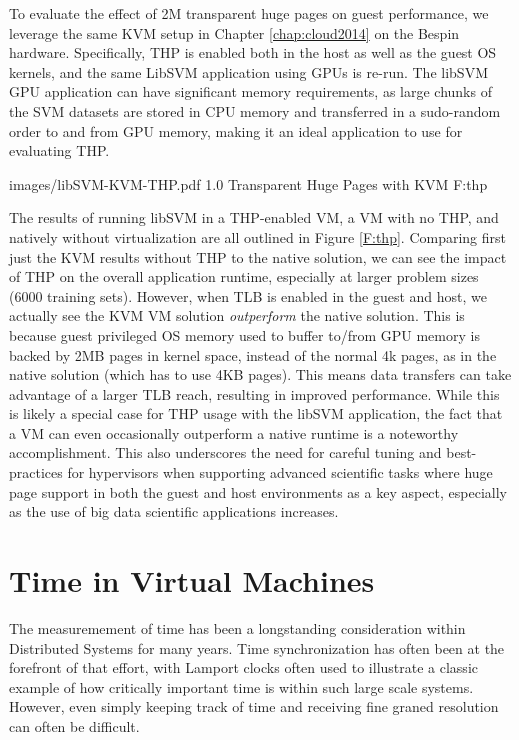 To evaluate the effect of 2M transparent huge pages on guest performance, we leverage the same KVM setup in Chapter \ref{chap:cloud2014} on the Bespin hardware. Specifically, THP is enabled both in the host as well as the guest OS kernels, and the same LibSVM application using GPUs is re-run. The libSVM GPU application can have significant memory requirements, as large chunks of the SVM datasets are stored in CPU memory and transferred in a sudo-random order to and from GPU memory, making it an ideal application to use for evaluating THP.



  {images/libSVM-KVM-THP.pdf}
  {1.0}
  {Transparent Huge Pages with KVM}
  {F:thp}


The results of running libSVM in a THP-enabled VM, a VM with no THP, and natively without virtualization are all outlined in Figure \ref{F:thp}.  Comparing first just the KVM results without THP to the native solution, we can see the impact of THP on the overall application runtime, especially at larger problem sizes (6000 training sets). However, when TLB is enabled in the guest and host, we actually see the KVM VM solution \emph{outperform} the native solution. This is because guest privileged OS memory used to buffer to/from GPU memory is backed by 2MB pages in kernel space, instead of the normal 4k pages, as in the native solution (which has to use 4KB pages). This means data transfers can take advantage of a larger TLB reach, resulting in improved performance.  While this is likely a special case for THP usage with the libSVM application, the fact that a VM can even occasionally outperform a native runtime is a noteworthy accomplishment. This also underscores the need for careful tuning and best-practices for hypervisors when supporting advanced scientific tasks where huge page support in both the guest and host environments as a key aspect, especially as the use of big data scientific applications increases.  

\section{Time in Virtual Machines}

The measuremement of time has been a longstanding consideration within Distributed Systems for many years.  Time synchronization has often been at the forefront of that effort, with Lamport clocks \cite{lamport1978time} often used to illustrate a classic example of how critically important time is within such large scale systems.  However, even simply keeping track of time and receiving fine graned resolution can often be difficult.  

